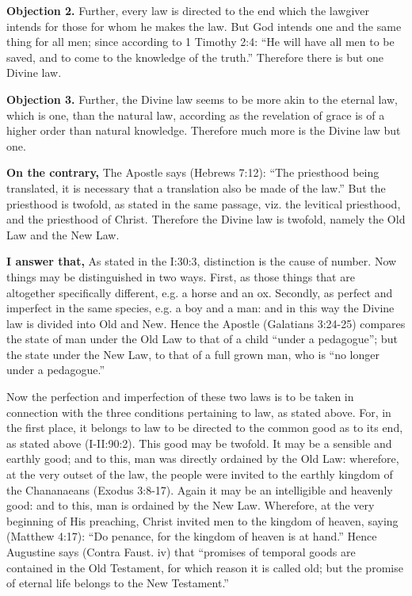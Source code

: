 \textbf{Objection 2.} Further, every law is directed to the end which the lawgiver intends for those for whom he makes the law. But God intends one and the same thing for all men; since according to 1 Timothy 2:4: ``He will have all men to be saved, and to come to the knowledge of the truth.'' Therefore there is but one Divine law.

\textbf{Objection 3.} Further, the Divine law seems to be more akin to the eternal law, which is one, than the natural law, according as the revelation of grace is of a higher order than natural knowledge. Therefore much more is the Divine law but one.

\textbf{On the contrary,} The Apostle says (Hebrews 7:12): ``The priesthood being translated, it is necessary that a translation also be made of the law.'' But the priesthood is twofold, as stated in the same passage, viz. the levitical priesthood, and the priesthood of Christ. Therefore the Divine law is twofold, namely the Old Law and the New Law.

\textbf{I answer that,} As stated in the I:30:3, distinction is the cause of number. Now things may be distinguished in two ways. First, as those things that are altogether specifically different, e.g. a horse and an ox. Secondly, as perfect and imperfect in the same species, e.g. a boy and a man: and in this way the Divine law is divided into Old and New. Hence the Apostle (Galatians 3:24-25) compares the state of man under the Old Law to that of a child ``under a pedagogue''; but the state under the New Law, to that of a full grown man, who is ``no longer under a pedagogue.''

Now the perfection and imperfection of these two laws is to be taken in connection with the three conditions pertaining to law, as stated above. For, in the first place, it belongs to law to be directed to the common good as to its end, as stated above (I-II:90:2). This good may be twofold. It may be a sensible and earthly good; and to this, man was directly ordained by the Old Law: wherefore, at the very outset of the law, the people were invited to the earthly kingdom of the Chananaeans (Exodus 3:8-17). Again it may be an intelligible and heavenly good: and to this, man is ordained by the New Law. Wherefore, at the very beginning of His preaching, Christ invited men to the kingdom of heaven, saying (Matthew 4:17): ``Do penance, for the kingdom of heaven is at hand.'' Hence Augustine says (Contra Faust. iv) that ``promises of temporal goods are contained in the Old Testament, for which reason it is called old; but the promise of eternal life belongs to the New Testament.''

